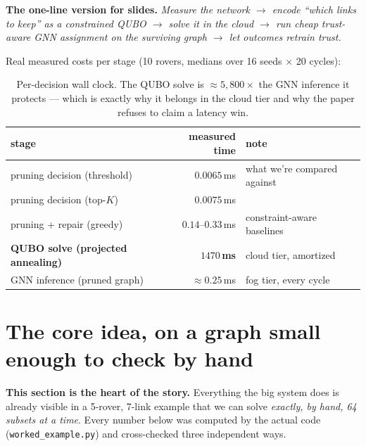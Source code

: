 \documentclass[11pt]{article}
\newenvironment{card}{%
  \def\FrameCommand{\fboxsep=8pt\fcolorbox{cardline}{cardbg}}%
  \MakeFramed{\advance\hsize-\width\FrameRestore}\noindent}{\endMakeFramed}
\newenvironment{goldcard}{%
  \def\FrameCommand{\fboxsep=8pt\fcolorbox{goldline}{goldbg}}%
  \MakeFramed{\advance\hsize-\width\FrameRestore}\noindent}{\endMakeFramed}
\newcommand{\key}[1]{\textcolor{quboc}{\textbf{#1}}}
\newcommand{\code}[1]{\texttt{#1}}
\begin{document}
\begin{card}
\textbf{The one-line version for slides.} \emph{Measure the network
$\rightarrow$ encode ``which links to keep'' as a constrained QUBO
$\rightarrow$ solve it in the cloud $\rightarrow$ run cheap trust-aware GNN
assignment on the surviving graph $\rightarrow$ let outcomes retrain trust.}
\end{card}

Real measured costs per stage (10 rovers, medians over 16 seeds $\times$ 20
cycles):

\begin{table}[h]
\centering
\small
\begin{tabular}{lrl}
\toprule
stage & measured time & note \\
\midrule
pruning decision (threshold) & $0.0065$\,ms & what we're compared against \\
pruning decision (top-$K$) & $0.0075$\,ms & \\
pruning + repair (greedy) & $0.14$--$0.33$\,ms & constraint-aware baselines \\
\key{QUBO solve (projected annealing)} & \key{$1470$\,ms} & cloud tier, amortized \\
GNN inference (pruned graph) & $\approx 0.25$\,ms & fog tier, every cycle \\
\bottomrule
\end{tabular}
\caption{Per-decision wall clock. The QUBO solve is $\approx
5{,}800\times$ the GNN inference it protects --- which is exactly why it
belongs in the cloud tier and why the paper refuses to claim a latency win.}
\end{table}

\section{The core idea, on a graph small enough to check by hand}

\begin{goldcard}
\textbf{This section is the heart of the story.} Everything the big system
does is already visible in a 5-rover, 7-link example that we can solve
\emph{exactly, by hand, 64 subsets at a time}. Every number below was
computed by the actual code (\code{worked\_example.py}) and cross-checked
three independent ways.
\end{goldcard}
\end{document}
